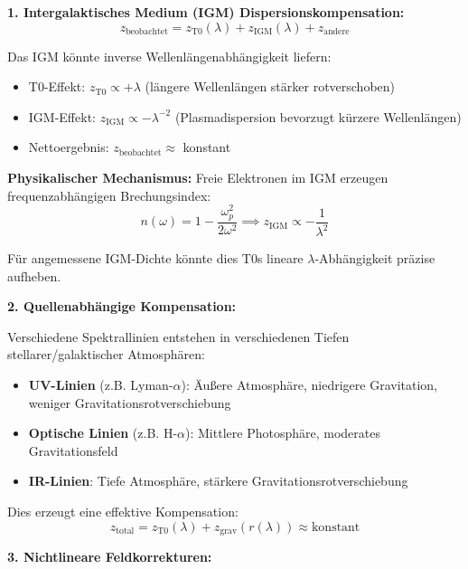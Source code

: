 \documentclass[12pt,a4paper]{article}
\theoremstyle{definition}
\begin{document}
	\textbf{1. Intergalaktisches Medium (IGM) Dispersionskompensation:}
	\begin{equation}
		z_{\text{beobachtet}} = z_{\text{T0}}(\lambda) + z_{\text{IGM}}(\lambda) + z_{\text{andere}}
	\end{equation}
	
	Das IGM k\"onnte inverse Wellenl\"angenabh\"angigkeit liefern:
	\begin{itemize}
		\item T0-Effekt: $z_{\text{T0}} \propto +\lambda$ (l\"angere Wellenl\"angen st\"arker rotverschoben)
		\item IGM-Effekt: $z_{\text{IGM}} \propto -\lambda^{-2}$ (Plasmadispersion bevorzugt k\"urzere Wellenl\"angen)
		\item Nettoergebnis: $z_{\text{beobachtet}} \approx$ konstant
	\end{itemize}
	
	\textbf{Physikalischer Mechanismus:} Freie Elektronen im IGM erzeugen frequenzabh\"angigen Brechungsindex:
	\begin{equation}
		n(\omega) = 1 - \frac{\omega_p^2}{2\omega^2} \implies z_{\text{IGM}} \propto -\frac{1}{\lambda^2}
	\end{equation}
	
	F\"ur angemessene IGM-Dichte k\"onnte dies T0s lineare $\lambda$-Abh\"angigkeit pr\"azise aufheben.
	
	\textbf{2. Quellenabh\"angige Kompensation:}
	
	Verschiedene Spektrallinien entstehen in verschiedenen Tiefen stellarer/galaktischer Atmosph\"aren:
	\begin{itemize}
		\item \textbf{UV-Linien} (z.B. Lyman-$\alpha$): \"Au\ss{}ere Atmosph\"are, niedrigere Gravitation, weniger Gravitationsrotverschiebung
		\item \textbf{Optische Linien} (z.B. H-$\alpha$): Mittlere Photosph\"are, moderates Gravitationsfeld
		\item \textbf{IR-Linien}: Tiefe Atmosph\"are, st\"arkere Gravitationsrotverschiebung
	\end{itemize}
	
	Dies erzeugt eine effektive Kompensation:
	\begin{equation}
		z_{\text{total}} = z_{\text{T0}}(\lambda) + z_{\text{grav}}(r(\lambda)) \approx \text{konstant}
	\end{equation}
	
	\textbf{3. Nichtlineare Feldkorrekturen:}
	
\end{document}
